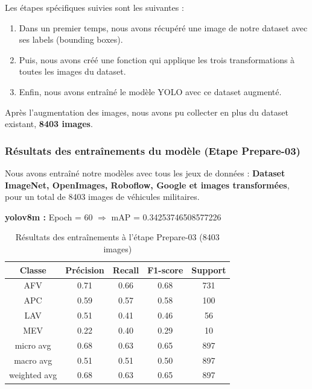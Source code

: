 \noindent Les étapes spécifiques suivies sont les suivantes :

\begin{enumerate}
    \item Dans un premier temps, nous avons récupéré une image de notre dataset avec ses labels (bounding boxes).
    \item Puis, nous avons créé une fonction qui applique les trois transformations à toutes les images du dataset.
    \item Enfin, nous avons entraîné le modèle YOLO avec ce dataset augmenté.
\end{enumerate}

Après l'augmentation des images, nous avons pu collecter en plus du dataset existant, \textbf{8403 images}.\\


\subsubsection{Résultats des entraînements du modèle (Etape Prepare-03) }
\label{results-prepare03}

Nous avons entraîné notre modèles avec tous les jeux de données :
\textbf{Dataset ImageNet, OpenImages, Roboflow, Google et images transformées}, pour un total de 8403 images de véhicules militaires.

\textbf{yolov8m :}
Epoch = 60 $\Rightarrow$ mAP = 0.34253746508577226

\begin{table}[H]
    \centering
    \begin{tabular}{|c|c|c|c|c|}
        \hline
        \textbf{Classe} & \textbf{Précision} & \textbf{Recall} & \textbf{F1-score} & \textbf{Support} \\ \hline
        AFV             & 0.71               & 0.66            & 0.68              & 731              \\ \hline
        APC             & 0.59               & 0.57            & 0.58              & 100              \\ \hline
        LAV             & 0.51               & 0.41            & 0.46              & 56               \\ \hline
        MEV             & 0.22               & 0.40            & 0.29              & 10               \\ \hline
        micro avg       & 0.68               & 0.63            & 0.65              & 897              \\ \hline
        macro avg       & 0.51               & 0.51            & 0.50              & 897              \\ \hline
        weighted avg    & 0.68               & 0.63            & 0.65              & 897              \\ \hline
    \end{tabular}
    \caption{Résultats des entraînements à l'étape Prepare-03 (8403 images)}
    \label{tab:results_moy_prepare03}
\end{table}

